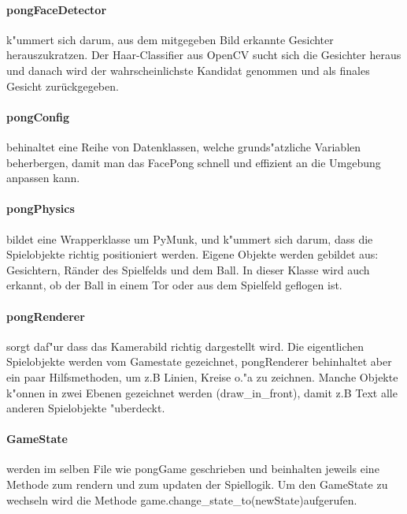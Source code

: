 \documentclass[12pt]{article}
\begin{document}
\paragraph{pongFaceDetector}
k"ummert sich darum, aus dem mitgegeben Bild erkannte Gesichter herauszukratzen.
Der Haar-Classifier aus OpenCV sucht sich die Gesichter heraus und danach wird
der wahrscheinlichste Kandidat genommen und als finales Gesicht zurückgegeben.
\paragraph{pongConfig}
behinaltet eine Reihe von Datenklassen, welche grunds"atzliche Variablen beherbergen,
damit man das FacePong schnell und effizient an die Umgebung anpassen kann.
\paragraph{pongPhysics}
bildet eine Wrapperklasse um PyMunk, und k"ummert sich darum, dass die Spielobjekte richtig
positioniert werden. Eigene Objekte werden gebildet aus: Gesichtern, Ränder des Spielfelds und 
dem Ball. In dieser Klasse wird auch erkannt, ob der Ball in einem Tor oder aus dem Spielfeld
geflogen ist.
\paragraph{pongRenderer}
sorgt daf"ur dass das Kamerabild richtig dargestellt wird. Die eigentlichen Spielobjekte
werden vom Gamestate gezeichnet, pongRenderer behinhaltet aber ein paar Hilfsmethoden,
um z.B Linien, Kreise o."a zu zeichnen. Manche Objekte k"onnen in zwei Ebenen gezeichnet
werden (draw\_in\_front), damit z.B Text alle anderen Spielobjekte "uberdeckt.
\paragraph{GameState}
werden im selben File wie pongGame geschrieben und beinhalten jeweils eine Methode zum 
rendern und zum updaten der Spiellogik. Um den GameState zu wechseln wird die Methode
game.change\_state\_to(newState)aufgerufen.
\end{document}
